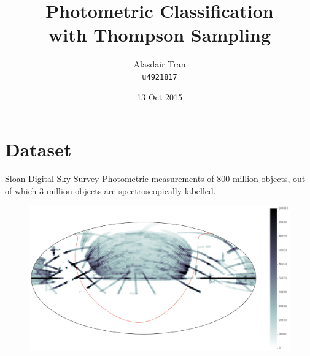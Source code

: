 \documentclass{beamer}
\title{Photometric Classification \\ with Thompson Sampling}
\subtitle{}
\institute{Supervisors: \\Cheng Soon Ong and Christian Wolf}
\author[Alasdair Tran]{Alasdair Tran \\ \texttt{u4921817}}
\date{\footnotesize{13 Oct 2015}}
\begin{document}
	
\begin{frame}
	\titlepage
\end{frame}

\section{Dataset}
\begin{frame}{Sloan Digital Sky Survey}
	Photometric measurements of 800 million objects, out of which
	3 million objects are spectroscopically labelled.
	\begin{figure}
		\centering
		\includegraphics[width=\textwidth]{images/sdss_coverage}
	\end{figure}
\end{frame}
\end{document}
